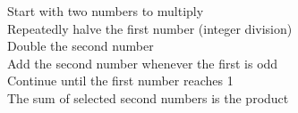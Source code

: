 \documentclass[preview]{standalone}
\begin{document}
Start with two numbers to multiply\\Repeatedly halve the first number (integer division)\\Double the second number\\Add the second number whenever the first is odd\\Continue until the first number reaches 1\\The sum of selected second numbers is the product\\
\end{document}
